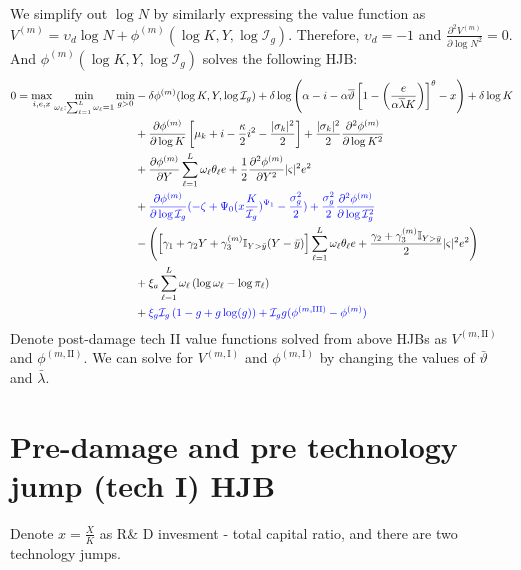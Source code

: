 \documentclass[11pt]{article}
\begin{document}
	We simplify out $\log N$ by similarly expressing the value function as  $V^{(m)} = \upsilon_d \log N + \phi^{(m)}(\log K, Y, \log \mathcal{I}_g)$. 
	Therefore, $\upsilon_d=-1$ and $\frac{\partial^2 V^{(m)}}{\partial \log N^2} = 0$. And $\phi^{(m)}(\log K,Y, \log \mathcal{I}_g)$ solves the following HJB:
	\begin{align*} 
		0 = \max_{i,e, x} \min_{\omega_\ell:\sum_{\ell = 1}^L \omega_\ell = 1 } \min_{g>0} &   - \delta \phi^{(m)}(\log K,Y, \log \mathcal{I}_g) +  \delta \log \left( \alpha - i -  \alpha \overline{\vartheta} \left[ 1 - \left(\frac {e} { \alpha \overline\lambda K} \right) \right]^\theta - x\right) + \delta\log K \cr 
		& + \frac {\partial \phi^{(m)}}{\partial \log K} 
		\left[ \mu_k    + i   - {\frac { \kappa} 2} i^2  -  \frac  {|\sigma_k|^2}  2\right]  + \frac {|\sigma_k|^2} 2  \frac {\partial^2 \phi^{(m)}}{\partial \log K^2} \cr
		& + \frac {\partial \phi^{(m)}}{\partial Y}  \sum_{\ell=1}^L \omega_\ell  \theta_\ell {e} + {\frac 1 2} \frac {\partial^2 \phi^{(m)}}{\partial Y^2} |\varsigma|^2 e^2  \cr
		& +\textcolor{blue}{ \frac{\partial \phi^{(m)}}{\partial \log \mathcal{I}_g} (- \zeta + \Psi_0 (x\frac{K}{\mathcal{I}_g})^{\Psi_1} - \frac{\sigma_g^2}{2} ) + \frac{\sigma_g^2}{2}\frac{\partial^2 \phi^{(m)}}{\partial \log \mathcal{I}_g^2}} \\
		& - \left( \left[ \gamma_1 + \gamma_2 Y + \gamma_3^{(m)} \mathbb{I}_{Y > \bar{y}} (Y - \bar{y})\right]   \sum_{\ell=1}^L \omega_\ell \theta_\ell {e} + \frac{\gamma_2 + \gamma_3^{(m)}\mathbb{I}_{Y>\bar{y}}}{2} |\varsigma|^2  e^2 \right) \cr
		& + \xi_a \sum_{\ell = 1}^L \omega_\ell \left( \log \omega_\ell - \log \pi_\ell \right)\\
	& +\textcolor{blue}{ \xi_g \mathcal{I}_g \left(1 - g + g  \log(g) \right) + \mathcal{I}_g g (\phi^{(m, \text{III})} - \phi^{(m)} )}
	\end{align*} 
Denote post-damage tech II value functions solved from above HJBs as  $V^{(m, \text{II})}$ and $\phi^{(m, \text{II})}$. We can solve for $V^{(m, \text{I})}$ and $\phi^{(m, \text{I})}$ by changing the values of $\bar\vartheta$ and $\bar\lambda$.

	\section{Pre-damage and pre technology jump (tech I) HJB}
	Denote $x = \frac{X}{K}$ as R\& D invesment - total capital ratio, and there are two technology jumps. 
	
\end{document}
